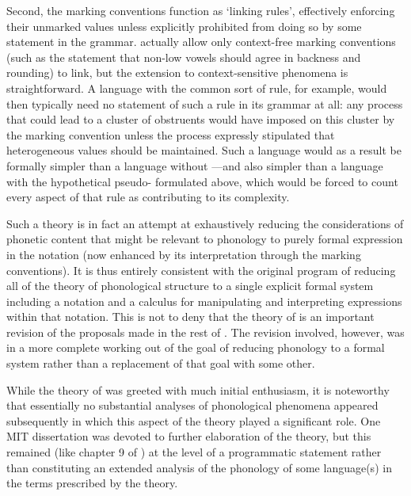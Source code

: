 Second, the marking conventions function as `linking rules',
effectively enforcing their unmarked values unless explicitly
prohibited from doing so by some statement in the
grammar. \citeauthor{spe} actually allow only context-free marking
conventions (such as the statement that non-low vowels should agree in
backness and rounding) to link, but the extension to context-sensitive
phenomena is straightforward. A language with the common sort of
  rule, for example, would then typically need no
statement of such a rule in its grammar at all: any process that could
lead to a cluster of obstruents would have  
imposed on this cluster by the marking convention unless the process
expressly stipulated that heterogeneous  values should be
maintained. Such a language would as a result be formally simpler than
a language without  —and also simpler than a
language with the hypothetical pseudo- formulated above,
which would be forced to count every aspect of that rule as
contributing to its complexity.

Such a theory is in fact an attempt at exhaustively reducing the
considerations of phonetic content that might be relevant to phonology
to purely formal expression in the notation (now enhanced by its
interpretation through the marking conventions). It is thus entirely
consistent with the original \textsl{} program of reducing all of
the theory of phonological structure to a single explicit formal
system including a notation and a calculus for manipulating and
interpreting expressions within that notation. This is not to deny
that the theory of  is an important revision of the
proposals made in the rest of \textsl{}. The revision involved,
however, was in a more complete working out of the goal of reducing
phonology to a formal system rather than a replacement of that goal
with some other.

While the theory of  was greeted with much initial
enthusiasm, it is noteworthy that essentially no substantial analyses
of phonological phenomena appeared subsequently in which this aspect
of the theory played a significant role. One MIT dissertation
\citep{kean75:thesis} was devoted to further elaboration of the
theory, but this remained (like chapter 9 of \textsl{}) at the
level of a programmatic statement rather than constituting an extended
analysis of the phonology of some language(s) in the terms prescribed
by the theory.

